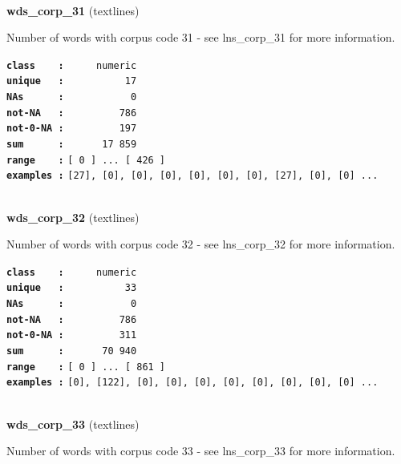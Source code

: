 \documentclass[]{article}
\begin{document}
~

\textbf{wds\_corp\_31} (textlines)

Number of words with corpus code 31 - see lns\_corp\_31 for more
information.

\textbf{\texttt{class\ \ \ \ :}} \texttt{~~~~~numeric}\\
\textbf{\texttt{unique\ \ \ :}} \texttt{~~~~~~~~~~17}\\
\textbf{\texttt{NAs\ \ \ \ \ \ :}} \texttt{~~~~~~~~~~~0}\\
\textbf{\texttt{not-NA\ \ \ :}} \texttt{~~~~~~~~~786}\\
\textbf{\texttt{not-0-NA\ :}} \texttt{~~~~~~~~~197}\\
\textbf{\texttt{sum\ \ \ \ \ \ :}} \texttt{~~~~~~17~859}\\
\textbf{\texttt{range\ \ \ \ :}}
\texttt{{[}\ 0\ {]}\ ...\ {[}\ 426\ {]}}\\
\textbf{\texttt{examples\ :}}
\texttt{{[}27{]},\ {[}0{]},\ {[}0{]},\ {[}0{]},\ {[}0{]},\ {[}0{]},\ {[}0{]},\ {[}27{]},\ {[}0{]},\ {[}0{]}\ ...}\\

~

\textbf{wds\_corp\_32} (textlines)

Number of words with corpus code 32 - see lns\_corp\_32 for more
information.

\textbf{\texttt{class\ \ \ \ :}} \texttt{~~~~~numeric}\\
\textbf{\texttt{unique\ \ \ :}} \texttt{~~~~~~~~~~33}\\
\textbf{\texttt{NAs\ \ \ \ \ \ :}} \texttt{~~~~~~~~~~~0}\\
\textbf{\texttt{not-NA\ \ \ :}} \texttt{~~~~~~~~~786}\\
\textbf{\texttt{not-0-NA\ :}} \texttt{~~~~~~~~~311}\\
\textbf{\texttt{sum\ \ \ \ \ \ :}} \texttt{~~~~~~70~940}\\
\textbf{\texttt{range\ \ \ \ :}}
\texttt{{[}\ 0\ {]}\ ...\ {[}\ 861\ {]}}\\
\textbf{\texttt{examples\ :}}
\texttt{{[}0{]},\ {[}122{]},\ {[}0{]},\ {[}0{]},\ {[}0{]},\ {[}0{]},\ {[}0{]},\ {[}0{]},\ {[}0{]},\ {[}0{]}\ ...}\\

~

\textbf{wds\_corp\_33} (textlines)

Number of words with corpus code 33 - see lns\_corp\_33 for more
information.
\end{document}
